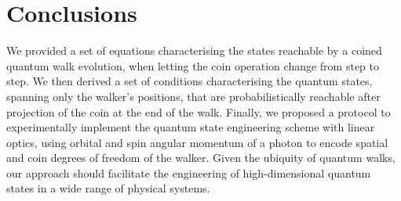 \section{Conclusions} We provided a set of equations characterising the states reachable by a coined quantum walk evolution, when letting the coin operation change from step to step.
We then derived a set of conditions characterising the quantum states, spanning only the walker's positions, that are probabilistically reachable after projection of the coin at the end of the walk.
Finally, we proposed a protocol to experimentally implement the quantum state engineering scheme with linear optics, using orbital and spin angular momentum of a photon to encode spatial and coin degrees of freedom of the walker.
Given the ubiquity of quantum walks, our approach should facilitate the engineering of high-dimensional quantum states in a wide range of physical systems.


